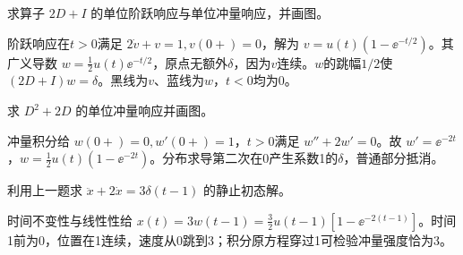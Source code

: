 \begin{exercise}\label{cw:rec16-2}
求算子 $2D+I$ 的单位阶跃响应与单位冲量响应，并画图。
\end{exercise}
\begin{solution}
阶跃响应在$t>0$满足 $2\dot v+v=1,v(0+)=0$，解为 $v=u(t)(1-\ee^{-t/2})$。其广义导数 $w=\frac12u(t)\ee^{-t/2}$，原点无额外$\delta$，因为$v$连续。$w$的跳幅$1/2$使$(2D+I)w=\delta$。黑线为$v$、蓝线为$w$，$t<0$均为0。\begin{center}\end{center}
\par{}
\end{solution}

\begin{exercise}\label{cw:rec16-3}
求 $D^2+2D$ 的单位冲量响应并画图。
\end{exercise}
\begin{solution}
冲量积分给 $w(0+)=0,w'(0+)=1$，$t>0$满足 $w''+2w'=0$。故 $w'=\ee^{-2t}$，$w=\frac12u(t)(1-\ee^{-2t})$。分布求导第二次在0产生系数1的$\delta$，普通部分抵消。\begin{center}\end{center}
\par{}
\end{solution}

\begin{exercise}\label{cw:rec16-4}
利用上一题求 $\ddot x+2\dot x=3\delta(t-1)$ 的静止初态解。
\end{exercise}
\begin{solution}
时间不变性与线性性给 $x(t)=3w(t-1)=\frac32u(t-1)[1-\ee^{-2(t-1)}]$。时间1前为0，位置在1连续，速度从0跳到3；积分原方程穿过1可检验冲量强度恰为3。
\par{}
\end{solution}

